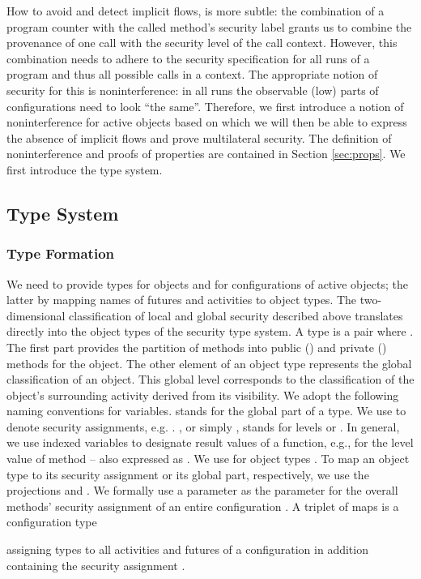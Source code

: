 \documentclass[10pt, conference, compsocconf]{IEEEtran}
\begin{document}
{How to avoid and detect implicit flows, is more subtle: the combination of a program counter 
with the called method's security label grants us to combine the provenance of one call with the
security level of the call context. However, this combination needs to adhere to the security specification 
for all runs of a program and thus all possible calls in a context. The appropriate notion of security
for this is noninterference: in all runs the observable (low) parts of configurations need to look
``the same''.  Therefore,  we first introduce a notion of noninterference for active objects 
based on which we will then 
be able to express the absence of implicit flows and prove multilateral security.
The definition of noninterference and proofs of properties are contained in Section 
\ref{sec:props}. We first introduce the type system.

\subsection{Type System}
\label{sec:typesformal}
\subsubsection*{Type Formation}
We need to provide types for objects and for configurations of active objects;
the latter by mapping names of futures and activities to object types.
The two-dimensional classification of local and global security described above
translates directly into the object types of the security type system.
A type is a pair   where .
The first part  provides the partition of methods into 
public () and private () methods for the object. 
The other element  of an object type represents the global
classification of an object. This global level corresponds to the
classification of the object's surrounding activity  derived from its visibility.
We adopt the following naming conventions for variables.
 stands for the global part of a type.
We use  to denote security assignments, e.g. .
, or simply , stands for levels  or .
In general, we use indexed variables to designate result values of a function, 
e.g.,  for the level value of method  -- also expressed as .
We use  for object types .
To map an object type  to its security assignment or its global part,
respectively, we use the projections  and .
We formally use a parameter  as the parameter for the overall 
methods' security assignment of an entire configuration . 
A triplet of maps is a configuration type 
 
assigning types to all activities and futures of a configuration in addition containing 
the security assignment .

}
\end{document}
